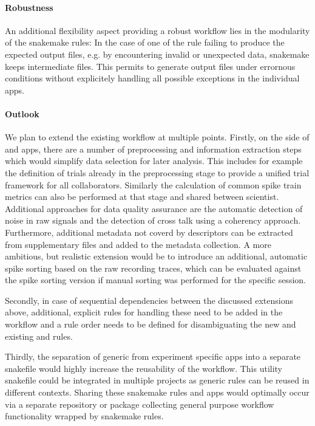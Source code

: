 \paragraph{Robustness}
An additional flexibility aspect providing a robust workflow lies in the modularity of the snakemake rules: In the case of one of the rule failing to produce the expected output files, e.g. by encountering invalid or unexpected data, snakemake keeps intermediate files. This permits to generate output files under errornous conditions without explicitely handling all possible exceptions in the individual apps.

\paragraph{Outlook}
We plan to extend the existing workflow at multiple points. Firstly, on the side of  and  apps, there are a number of preprocessing and information extraction steps  which would simplify data selection for later analysis. This includes for example the definition of trials already in the preprocessing stage to provide a unified trial framework for all collaborators. Similarly the calculation of common spike train metrics can also be performed at that stage and shared between scientist. Additional approaches for data quality assurance are the automatic detection of noise in raw signals and the detection of cross talk using a coherency approach. Furthermore, additional metadata not coverd by descriptors can be extracted from supplementary files and added to the metadata collection. A more ambitious, but realistic extension would be to introduce an additional, automatic spike sorting based on the raw recording traces, which can be evaluated against the spike sorting version if manual sorting was performed for the specific session. 

Secondly, in case of sequential dependencies between the discussed extensions above, additional, explicit rules for handling these need to be added in the workflow and a rule order needs to be defined for disambiguating the new and existing  and  rules.

Thirdly, the separation of generic from experiment specific apps into a separate snakefile would highly increase the reusability of the workflow. This utility snakefile could be integrated in multiple projects as generic rules can be reused in different contexts. Sharing these snakemake rules and apps would optimally occur via a separate repository or package collecting general purpose workflow functionality wrapped by snakemake rules.

